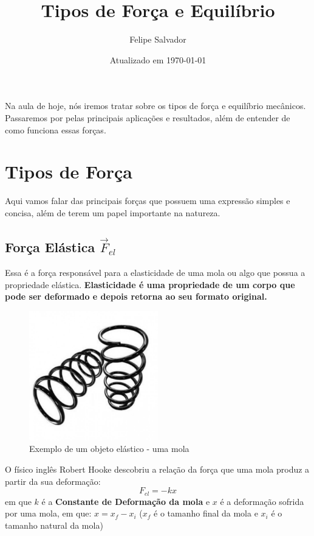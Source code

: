 \documentclass[12pt]{extarticle}
\title{Tipos de Força e Equilíbrio}
\author{Felipe Salvador}
\date{Atualizado em \today}
\newcommand{\<}{\langle}
\renewcommand{\>}{\rangle}
\theoremstyle{definition}
\begin{document}
\maketitle

Na aula de hoje, nós iremos tratar sobre os tipos de força e equilíbrio mecânicos. Passaremos por pelas principais aplicações e resultados, além de entender de como funciona essas forças.
\section{Tipos de Força}
Aqui vamos falar das principais forças que possuem uma expressão simples e concisa, além de terem um papel importante na natureza.
\subsection{Força Elástica $\vec{F}_{el}$}

Essa é a força responsável para a elasticidade de uma mola ou algo que possua a propriedade elástica. \textbf{Elasticidade é uma propriedade de um corpo que pode ser deformado e depois retorna ao seu formato original.}

\begin{figure}[h]
    \centering
    \includegraphics[width=0.5\textwidth]{molas_dianteiras_originais_150.jpg}
    \caption{Exemplo de um objeto elástico - uma mola}
    \label{fig:mola}
\end{figure}

O físico inglês Robert Hooke descobriu a relação da força que uma mola produz a partir da sua deformação:
\begin{equation}
    F_{el} = -kx
\end{equation}
\noindent em que $k$ é a \textbf{Constante de Deformação da mola} e $x$ é a deformação sofrida por uma mola, em que: $x=x_f - x_i$ ($x_f$ é o tamanho final da mola e $x_i$ é o tamanho natural da mola)
\end{document}
